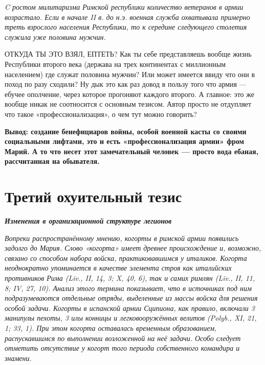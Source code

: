 \textit{C ростом милитаризма Римской республики количество ветеранов в армии возрастало. Если в начале II в. до н.э. военная служба охватывала примерно треть взрослого населения Республики, то к середине следующего столетия служила уже половина мужчин.}

ОТКУДА ТЫ ЭТО ВЗЯЛ, ЕПТЕТЬ? Как ты себе представляешь вообще жизнь Республики второго века (держава на трех континентах с миллионным населением) где служат половина мужчин? Или может имеется ввиду что они в поход по разу сходили? Ну дык это как раз довод в пользу того что армия — ебучее ополчение, через которое прогоняют каждого второго. А главное: это же вообще никак не соотносится с основным тезисом. Автор просто не отдупляет что такое «профессионализация», о чем тут можно говорить?


\textbf{Вывод: создание бенефициаров войны, особой военной касты со своими социальными лифтами, это и есть «профессионализация армии» фром Марий. А то что несет этот замечательный человек — просто вода ебаная, рассчитанная на обывателя.
}

\section{Третий охуительный тезис}

\textbf{\textit{Изменения в организационной структуре легионов}}

\textit{Вопреки распространённому мнению, когорты в римской армии появились задолго до Мария. Слово «когорта» имеет древнее происхождение и, возможно, связано со способом набора войска, практиковавшимся у италиков. Когорта неоднократно упоминается в качестве элемента строя как италийских противников Рима (Liv., II, 14, 3; X, 40, 6), так и самих римлян (Liv., II, 11, 8; IV, 27, 10). Анализ этого термина показывает, что в источниках под ним подразумеваются отдельные отряды, выделенные из массы войска для решения особой задачи. Когорты в испанской армии Сципиона, как правило, включали 3 манипулы пехоты, 3 илы конницы и легковооружённых велитов (Polyb., XI, 21, 1; 33, 1). При этом когорта оставалась временным образованием, распускавшимся по выполнении возложенной на неё задачи. Особо следует отметить отсутствие у когорт того периода собственного командира и знамени.}


